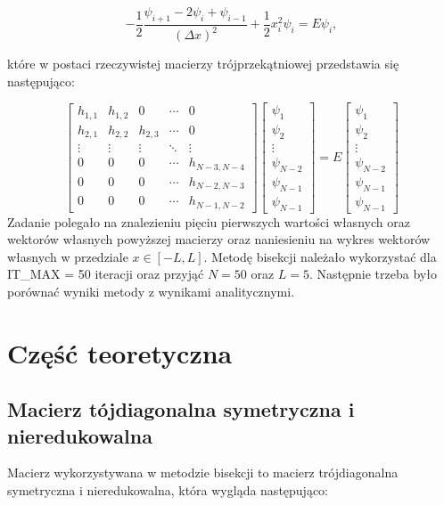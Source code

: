 \documentclass{article}
\begin{document}
\begin{equation}
-\frac{1}{2} \frac{\psi_{i+1} - 2\psi_i + \psi_{i-1}}{(\Delta x)^2} + \frac{1}{2} x_i^2\psi_i = E\psi_i,
\end{equation}

\noindent
które w postaci rzeczywistej macierzy trójprzekątniowej przedstawia się następująco:

\begin{equation*}
\begin{bmatrix}
h_{1,1} & h_{1,2} & 0 & \cdots & 0 \\
h_{2,1} & h_{2,2} & h_{2,3} & \cdots & 0 \\
\vdots & \vdots & \vdots & \ddots & \vdots \\
0 & 0 & 0 & \cdots & h_{N-3,N-4} \\
0 & 0 & 0 & \cdots & h_{N-2,N-3} \\
0 & 0 & 0 & \cdots & h_{N-1,N-2}
\end{bmatrix}
\begin{bmatrix}
\psi_{1} \\
\psi_{2} \\
\vdots \\
\psi_{N-2} \\
\psi_{N-1} \\
\psi_{N-1}
\end{bmatrix}
= E
\begin{bmatrix}
\psi_{1} \\
\psi_{2} \\
\vdots \\
\psi_{N-2} \\
\psi_{N-1} \\
\psi_{N-1}
\end{bmatrix}
\end{equation*}
\noindent
Zadanie polegało na znalezieniu pięciu pierwszych wartości własnych oraz wektorów własnych powyższej macierzy oraz naniesieniu na wykres wektorów własnych w przedziale $x \in [-L,L]$. Metodę bisekcji należało wykorzystać dla {IT\_MAX = 50} iteracji oraz przyjąć $N = 50$ oraz $L = 5$. Następnie trzeba było porównać wyniki metody z wynikami analitycznymi.

\newpage
\section{Część teoretyczna}

\subsection{Macierz tójdiagonalna symetryczna i nieredukowalna}
Macierz wykorzystywana w metodzie bisekcji to macierz trójdiagonalna symetryczna i nieredukowalna, która wygląda następująco:
\end{document}
